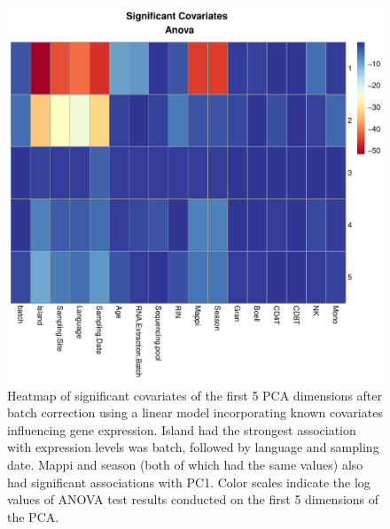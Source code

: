 \documentclass[12pt,a4paper,titlepage,twoside,openright]{book}
\begin{document}
\begin{mainmatter}
{\begin{figure}[htb!]
\centering
\includegraphics[width=\textwidth,height=\textheight,keepaspectratio]{Figures/significantCovariates_AnovaHeatmap_removeBatcheffect.pdf}
\caption{Heatmap of significant covariates of the first 5 PCA dimensions after batch correction using a linear model incorporating known covariates influencing gene expression. Island had the strongest association with expression levels was batch, followed by language and sampling date. Mappi and season (both of which had the same values) also had significant associations with PC1. Color scales indicate the log values of ANOVA test results conducted on the first 5 dimensions of the PCA.}
\label{fig:ANOVA Remove batch effect}
\end{figure}

}
\end{mainmatter}
\end{document}

